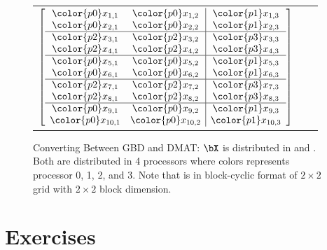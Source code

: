 \begin{figure}
\begin{center}
\begin{tabular}{ccc}
$
\left[
\begin{array}{cc|c}
\color{p0}x_{1,1} & \color{p0}x_{1,2} & \color{p1}x_{1,3} \\
\color{p0}x_{2,1} & \color{p0}x_{2,2} & \color{p1}x_{2,3} \\ \hline
\color{p2}x_{3,1} & \color{p2}x_{3,2} & \color{p3}x_{3,3} \\
\color{p2}x_{4,1} & \color{p2}x_{4,2} & \color{p3}x_{4,3} \\ \hline
\color{p0}x_{5,1} & \color{p0}x_{5,2} & \color{p1}x_{5,3} \\
\color{p0}x_{6,1} & \color{p0}x_{6,2} & \color{p1}x_{6,3} \\ \hline
\color{p2}x_{7,1} & \color{p2}x_{7,2} & \color{p3}x_{7,3} \\
\color{p2}x_{8,1} & \color{p2}x_{8,2} & \color{p3}x_{8,3} \\ \hline
\color{p0}x_{9,1} & \color{p0}x_{9,2} & \color{p1}x_{9,3} \\
\color{p0}x_{10,1} & \color{p0}x_{10,2} & \color{p1}x_{10,3} \\
\end{array}
\right]
$
\end{tabular}
\end{center}
\caption[Converting Between GBD and DMAT]{
Converting Between GBD and DMAT:  $\bX$ is distributed in
 and .
Both are distributed in 4 processors
where colors represents processor {\color{p0}0},
{\color{p1}1}, {\color{p2}2}, and {\color{p3}3}.
Note that  is in block-cyclic format of
$2\times 2$ grid with $2\times 2$ block dimension.
}
\label{fig:gbd_dmat}
\end{figure}



\section{Exercises}
\label{sec:redist_exercise}

